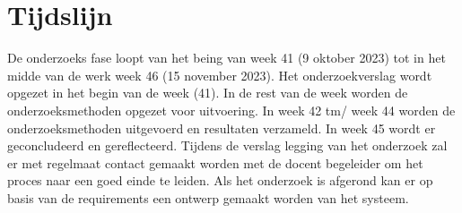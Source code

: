 \section{Tijdslijn}
De onderzoeks fase loopt van het being van week 41 (9 oktober 2023) tot in het midde van de werk week 46 (15 november 2023).
Het onderzoekverslag wordt opgezet in het begin van de week (41). In de rest van de week worden de onderzoeksmethoden opgezet voor uitvoering.
In week 42 tm/ week 44 worden de onderzoeksmethoden uitgevoerd en resultaten verzameld. In week 45 wordt er geconcludeerd en gereflecteerd.
Tijdens de verslag legging van het onderzoek zal er met regelmaat contact gemaakt worden met de docent begeleider om het proces naar een goed einde te leiden.
Als het onderzoek is afgerond kan er  op basis van de requirements een ontwerp gemaakt worden van het systeem.

